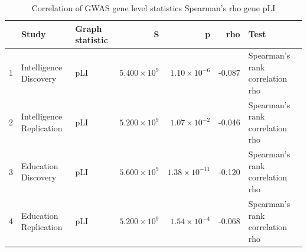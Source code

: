 \begin{table}[ht]
\centering
\begin{adjustbox}{max width=\textwidth}
\begin{tabular}{rllrrrl}
  \hline
 & Study & Graph statistic & S & p & rho & Test \\ 
  \hline
1 & Intelligence Discovery & pLI & $5.400 \times 10^{9}$ & $1.10 \times 10^{-6}$ & -0.087 & Spearman's rank correlation rho \\ 
  2 & Intelligence Replication & pLI & $5.200 \times 10^{9}$ & $1.07 \times 10^{-2}$ & -0.046 & Spearman's rank correlation rho \\ 
  3 & Education Discovery & pLI & $5.600 \times 10^{9}$ & $1.38 \times 10^{-11}$ & -0.120 & Spearman's rank correlation rho \\ 
  4 & Education Replication & pLI & $5.200 \times 10^{9}$ & $1.54 \times 10^{-4}$ & -0.068 & Spearman's rank correlation rho \\ 
   \hline
\end{tabular}
\end{adjustbox}
\caption{Correlation of GWAS gene level statistics Spearman's rho gene pLI} 
\label{Table:Correlation of GWAS gene level statistics Spearmans rho gene pLI}
\end{table}

